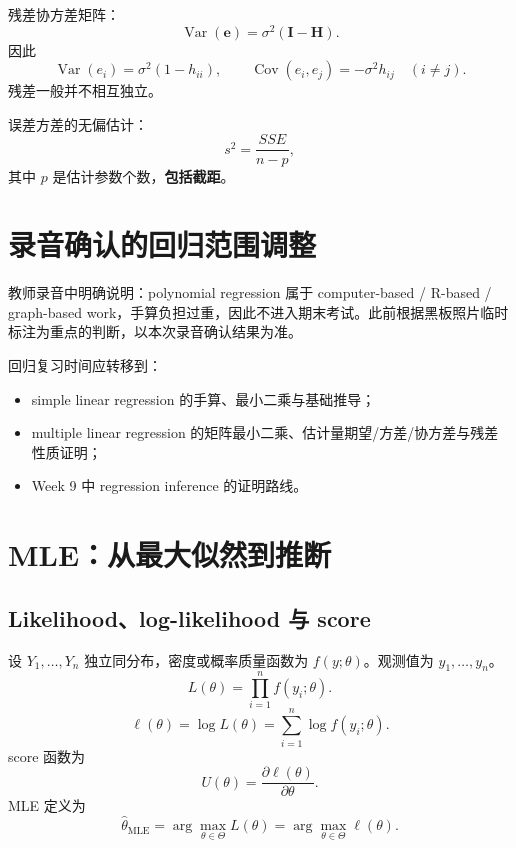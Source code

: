 \documentclass[11pt,a4paper]{article}
\newcommand{\Var}{\operatorname{Var}}
\newcommand{\Cov}{\operatorname{Cov}}
\newcommand{\1}{\mathbf{1}}
\newcommand{\bH}{\mathbf{H}}
\newcommand{\bI}{\mathbf{I}}
\newcommand{\be}{\mathbf{e}}
\begin{document}
残差协方差矩阵：
\[
  \boxed{
  \Var(\be)=\sigma^2(\bI-\bH).
  }
\]
因此
\[
  \Var(e_i)=\sigma^2(1-h_{ii}),
\qquad
  \Cov(e_i,e_j)=-\sigma^2h_{ij}\quad(i\ne j).
\]
残差一般并不相互独立。

误差方差的无偏估计：
\[
  \boxed{
  s^2=\frac{SSE}{n-p},
  }
\]
其中 $p$ 是估计参数个数，\textbf{包括截距}。

\section{录音确认的回归范围调整}

\begin{scopebox}
教师录音中明确说明：polynomial regression 属于 computer-based / R-based / graph-based work，手算负担过重，因此不进入期末考试。此前根据黑板照片临时标注为重点的判断，以本次录音确认结果为准。

回归复习时间应转移到：
\begin{itemize}
  \item simple linear regression 的手算、最小二乘与基础推导；
  \item multiple linear regression 的矩阵最小二乘、估计量期望/方差/协方差与残差性质证明；
  \item Week 9 中 regression inference 的证明路线。
\end{itemize}
\end{scopebox}

\section{MLE：从最大似然到推断}

\subsection{Likelihood、log-likelihood 与 score}

设 $Y_1,\ldots,Y_n$ 独立同分布，密度或概率质量函数为
$f(y;\theta)$。观测值为 $y_1,\ldots,y_n$。
\[
  \boxed{
  L(\theta)
  =
  \prod_{i=1}^nf(y_i;\theta).
  }
\]
\[
  \boxed{
  \ell(\theta)
  =
  \log L(\theta)
  =
  \sum_{i=1}^n\log f(y_i;\theta).
  }
\]
score 函数为
\[
  \boxed{
  U(\theta)
  =
  \frac{\partial\ell(\theta)}{\partial\theta}.
  }
\]
MLE 定义为
\[
  \boxed{
  \hat\theta_{\mathrm{MLE}}
  =
  \arg\max_{\theta\in\Theta}L(\theta)
  =
  \arg\max_{\theta\in\Theta}\ell(\theta).
  }
\]
\end{document}

